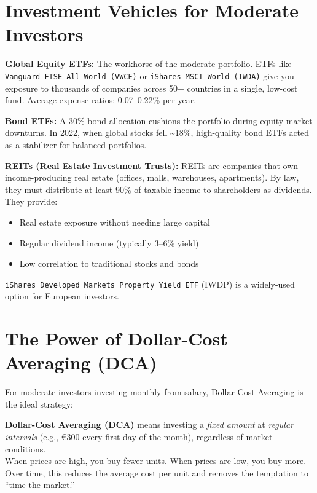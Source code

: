 \documentclass[12pt, a4paper]{book}
\begin{document}
\section{Investment Vehicles for Moderate Investors}

\textbf{Global Equity ETFs:} The workhorse of the moderate portfolio. ETFs like \texttt{Vanguard FTSE All-World (VWCE)} or \texttt{iShares MSCI World (IWDA)} give you exposure to thousands of companies across 50+ countries in a single, low-cost fund. Average expense ratios: 0.07--0.22\% per year.

\textbf{Bond ETFs:} A 30\% bond allocation cushions the portfolio during equity market downturns. In 2022, when global stocks fell \textasciitilde{}18\%, high-quality bond ETFs acted as a stabilizer for balanced portfolios.

\textbf{REITs (Real Estate Investment Trusts):} REITs are companies that own income-producing real estate (offices, malls, warehouses, apartments). By law, they must distribute at least 90\% of taxable income to shareholders as dividends. They provide:
\begin{itemize}[leftmargin=1.5cm]
  \item Real estate exposure without needing large capital
  \item Regular dividend income (typically 3--6\% yield)
  \item Low correlation to traditional stocks and bonds
\end{itemize}

\texttt{iShares Developed Markets Property Yield ETF} (IWDP) is a widely-used option for European investors.

\section{The Power of Dollar-Cost Averaging (DCA)}

For moderate investors investing monthly from salary, Dollar-Cost Averaging is the ideal strategy:

\begin{keybox}
\textbf{Dollar-Cost Averaging (DCA)} means investing a \textit{fixed amount} at \textit{regular intervals} (e.g., \euro{}300 every first day of the month), regardless of market conditions.\\[4pt]
When prices are high, you buy fewer units. When prices are low, you buy more. Over time, this reduces the average cost per unit and removes the temptation to ``time the market.''
\end{keybox}
\end{document}
